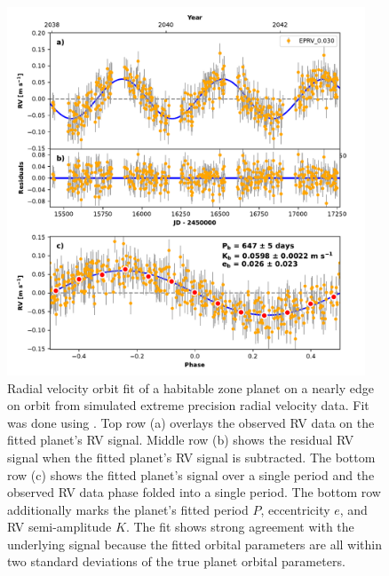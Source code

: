 \begin{figure}
  \begin{center}
    \includegraphics[width=0.95\textwidth]{ch3/figures/orbit_plot_mc_HIP_91438.pdf}
  \end{center}
  \caption{Radial velocity orbit fit of a habitable zone planet on a nearly edge on orbit from
  simulated extreme precision radial velocity data. Fit was done using
  \citep{rosenthalCaliforniaLegacy2021}. Top row
  (a) overlays the observed RV data on the fitted planet's RV signal. Middle
  row (b) shows the residual RV signal when the fitted planet's RV signal is
  subtracted. The bottom row (c) shows the fitted planet's signal over a single
  period and the observed RV data phase folded into a single period. The bottom row
  additionally marks the planet's fitted period $P$, eccentricity $e$, and RV
  semi-amplitude $K$. The fit shows strong agreement with the underlying signal
  because the fitted orbital parameters are all within two standard deviations of the true
  planet orbital parameters.}
  \label{fig:rv_fit}
\end{figure}

